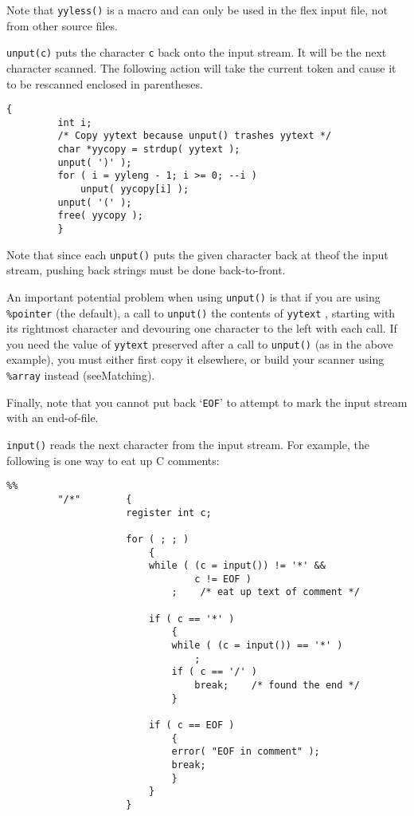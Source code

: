 \documentclass[openany,oneside]{book}
\begin{document}
Note that \verb`yyless()` is a macro and can only be used in the flex
input file, not from other source files.

 \verb`unput(c)` puts the character \verb`c` back onto the input stream. 
It will be the next character scanned.  The following action will take
the current token and cause it to be rescanned enclosed in parentheses.


\begin{verbatim}
{
         int i;
         /* Copy yytext because unput() trashes yytext */
         char *yycopy = strdup( yytext );
         unput( ')' );
         for ( i = yyleng - 1; i >= 0; --i )
             unput( yycopy[i] );
         unput( '(' );
         free( yycopy );
         }
\end{verbatim}


Note that since each \verb`unput()` puts the given character back at theof the input stream, pushing back strings must be done
back-to-front.

An important potential problem when using \verb`unput()` is that if you
are using \verb`%pointer` (the default), a call to \verb`unput()` the contents of \verb`yytext` , starting with its
rightmost character and devouring one character to the left with each
call.  If you need the value of \verb`yytext` preserved after a call to \verb`unput()` (as in the above example), you must either first copy it
elsewhere, or build your scanner using \verb`%array` instead
(seeMatching).

Finally, note that you cannot put back ‘\verb`EOF`’ to attempt to mark the
input stream with an end-of-file.

 \verb`input()` reads the next character from the input stream.  For
example, the following is one way to eat up C comments:


\begin{verbatim}
%%
         "/*"        {
                     register int c;
     
                     for ( ; ; )
                         {
                         while ( (c = input()) != '*' &&
                                 c != EOF )
                             ;    /* eat up text of comment */
     
                         if ( c == '*' )
                             {
                             while ( (c = input()) == '*' )
                                 ;
                             if ( c == '/' )
                                 break;    /* found the end */
                             }
     
                         if ( c == EOF )
                             {
                             error( "EOF in comment" );
                             break;
                             }
                         }
                     }
\end{verbatim}
\end{document}
